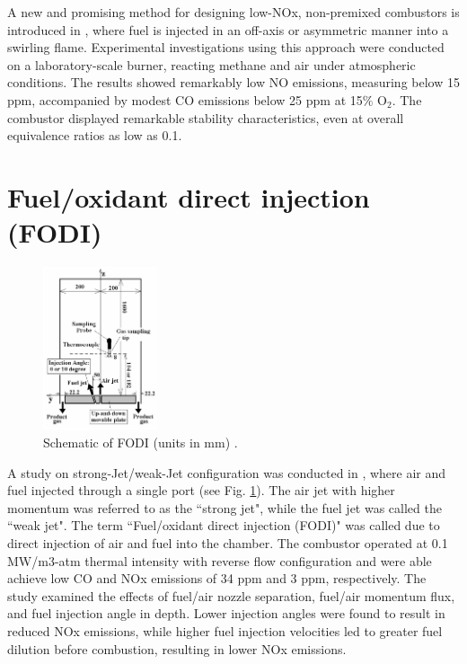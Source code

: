 A new and promising method for designing low-NOx, non-premixed combustors is introduced in \cite{YETTER20001265}, where fuel is injected in an off-axis or asymmetric manner into a swirling flame. Experimental investigations using this approach were conducted on a laboratory-scale burner, reacting methane and air under atmospheric conditions. The results showed remarkably low NO emissions, measuring below 15 ppm, accompanied by modest CO emissions below 25 ppm at 15$\%$ O$_2$. The combustor displayed remarkable stability characteristics, even at overall equivalence ratios as low as 0.1.

\section{Fuel/oxidant direct injection (FODI)}
\begin{figure}
\vspace{-10mm}
    \centering
    \includegraphics[width=0.3\textwidth]{Chapter2/Images/FODI.jpeg}
  \caption[Schematic of FODI]{Schematic of FODI (units in mm) \cite{He2008FlamelessCO}.}
  \label{fig:FODI}
\end{figure}

A study on strong-Jet/weak-Jet configuration was conducted in \cite{He2008FlamelessCO}, where air and fuel injected through a single port (see Fig. \ref{fig:FODI}). The air jet with higher momentum was referred to as the ``strong jet", while the fuel jet was called the ``weak jet". The term ``Fuel/oxidant direct injection (FODI)" was called due to direct injection of air and fuel into the chamber. The combustor operated at 0.1 MW/m3-atm thermal intensity with reverse flow configuration and were able achieve low CO and NOx emissions of 34 ppm and 3 ppm, respectively. The study examined the effects of fuel/air nozzle separation, fuel/air momentum flux, and fuel injection angle in depth. Lower injection angles were found to result in reduced NOx emissions, while higher fuel injection velocities led to greater fuel dilution before combustion, resulting in lower NOx emissions. 

